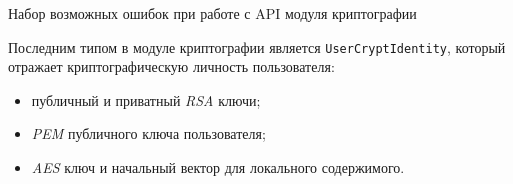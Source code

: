 \begin{code}
	
   \caption{Набор возможных ошибок при работе с API модуля криптографии}
   \label{sec:development:client:encryption:code:errors}
\end{code}

Последним типом в модуле криптографии является \texttt{UserCryptIdentity}, который отражает криптографическую личность пользователя:
\begin{itemize}
	\item публичный и приватный \textit{RSA} ключи;
	\item \textit{PEM} публичного ключа пользователя;
	\item \textit{AES} ключ и начальный вектор для локального содержимого.
\end{itemize}